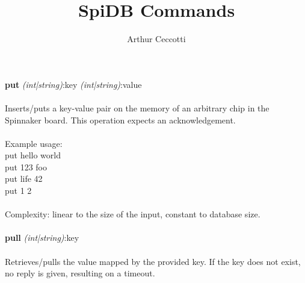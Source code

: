 \documentclass{article}
\title{SpiDB Commands}
\author{Arthur Ceccotti}
\begin{document}
  \maketitle

\noindent
 {\large\textbf{put} \textit{(int|string)}:key \textit{(int|string)}:value} \\\\
 Inserts/puts a key-value pair on the memory of an arbitrary chip in the Spinnaker board. This operation expects an acknowledgement.\\\\
\noindent
 Example usage:\\
 put hello world\\
 put 123 foo\\
 put life 42\\
 put 1 2\\\\
\noindent 
 Complexity: linear to the size of the input, constant to database size.\\\\
 
\noindent
 {\large\textbf{pull} \textit{(int|string)}:key}\\\\
 Retrieves/pulls the value mapped by the provided key. If the key does not exist, no reply is given, resulting on a timeout.\\\\
\end{document}
